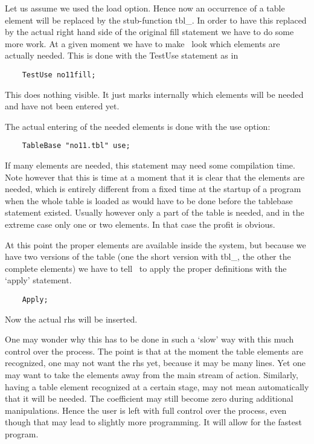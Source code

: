 Let us assume we used the load option. Hence now an occurrence of a table 
element will be replaced by the stub-function 
tbl\_. In order to have this replaced by the actual right hand 
side of the original fill statement we have to do some more work. At a 
given moment we have to make \FORM\ look which elements are actually needed. 
This is done with the TestUse statement as in
\begin{verbatim}
    TestUse no11fill;
\end{verbatim}
This does nothing visible. It just marks internally which elements will be 
needed and have not been entered yet.

The actual entering of the needed elements is done with the use 
option:\begin{verbatim}
    TableBase "no11.tbl" use;
\end{verbatim}
If many elements are needed, this statement may need some compilation time. 
Note however that this is time at a moment that it is clear that the 
elements are needed, which is entirely different from a fixed time at the 
startup of a program when the whole table is loaded as would have to be 
done before the tablebase statement existed. Usually however only a 
part of the table is needed, and in the extreme case only one or two 
elements. In that case the profit is obvious.

At this point the proper elements are available inside the system, but 
because we have two versions of the table (one the short version with 
tbl\_, the other the complete elements) we have to tell \FORM\ to apply 
the proper definitions with the `apply' statement.
\begin{verbatim}
    Apply;
\end{verbatim}
Now the actual rhs will be inserted.

One may wonder why this has to be done in such a `slow' way with this much 
control over the process. The point is that at the moment the table 
elements are recognized, one may not want the rhs yet, because it may be 
many lines. Yet one may want to take the elements away from the main stream 
of action. Similarly, having a table element recognized at a certain stage, 
may not mean automatically that it will be needed. The coefficient may 
still become zero during additional manipulations. Hence the user is left 
with full control over the process, even though that may lead to slightly 
more programming. It will allow for the fastest program.

